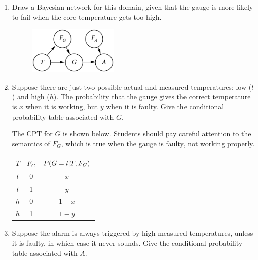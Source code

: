 \documentclass[11pt, a4paper]{article}
\begin{document}
\begin{enumerate}
    \item Draw a Bayesian network for this domain, given that the gauge is more likely to fail when the core temperature gets too high.

    \begin{solution}
        \begin{figure}[h]
            \centering
            \includegraphics[width=0.4\textwidth]{figures/e3_nuclear.png}
        \end{figure}
    \end{solution}

    \item Suppose there are just two possible actual and measured temperatures: low ($l$) and high ($h$). The probability that the gauge gives the correct temperature is $x$ when it is working, but $y$ when it is faulty. Give the conditional probability table associated with $G$.

    \begin{solution}
        The CPT for $G$ is shown below. Students should pay careful attention to the semantics of $F_G$, which is true when the gauge is faulty, \ie{} not working properly.
        \begin{table}[h]
            \centering
            \begin{tabular}{cc|c}
                \toprule
                 $T$ & $F_G$ & $P(G = l \vert T, F_G)$ \\
                 \midrule
                 $l$ & 0 & $x$ \\
                 $l$ & 1 & $y$ \\
                 $h$ & 0 & $1 - x$ \\
                 $h$ & 1 & $1 - y$ \\
                 \bottomrule
            \end{tabular}
        \end{table}
    \end{solution}

    \item Suppose the alarm is always triggered by high measured temperatures, unless it is faulty, in which case it never sounds. Give the conditional probability table associated with $A$.


\end{enumerate}
\end{document}
